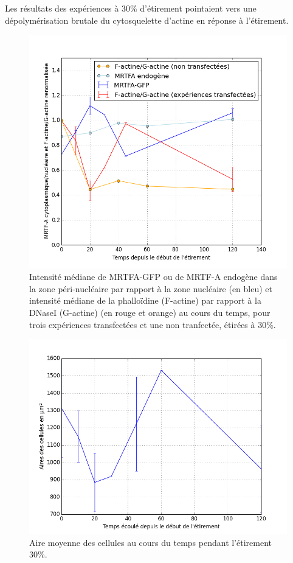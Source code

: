 Les résultats des expériences à 30\% d'étirement pointaient vers une dépolymérisation brutale du cytosquelette d'actine en réponse à l'étirement. 

\begin{figure}
\includegraphics[scale=0.5]{Figures/Et30_MRTFA_FG.png} 
\caption{\label{Et30_MRTFA_FG} Intensité médiane de MRTFA-GFP ou de MRTF-A endogène dans la zone péri-nucléaire par rapport à la zone nucléaire (en bleu) et intensité médiane de la phalloïdine (F-actine) par rapport à la DNaseI (G-actine) (en rouge et orange)  au cours du temps, pour trois expériences transfectées et une non tranfectée, étirées à 30\%.  }
\end{figure}
\begin{figure}
\includegraphics[scale=0.5]{Figures/Et30_Aires.png} 
\caption{\label{Et30_Aires} Aire moyenne des cellules au cours du temps pendant l'étirement 30\%. }
\end{figure}

